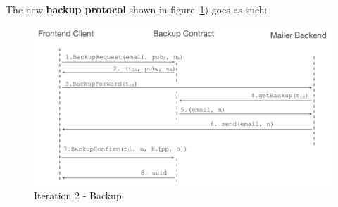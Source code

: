 \documentclass[runningheads]{llncs}
\begin{document}
The new {\bf backup protocol} shown in figure~\ref{it2:backup}) goes as such:

\begin{figure}[t]
  \includegraphics[width=\linewidth]{./media/media-003.png}
  \caption{Iteration 2 - Backup}
  \label{it2:backup}
\end{figure}
\end{document}
